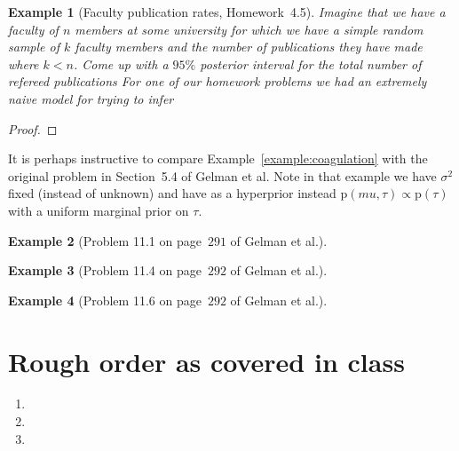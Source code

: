 \documentclass{article}
\newtheorem{example}{Example}
\newcommand{\pdens}[1]{\text{p}\left( #1 \right)}
\begin{document}
\begin{example}[Faculty publication rates, Homework~4.5]
	Imagine that we have a faculty of $n$ members at some university for which we have a simple random sample of $k$ faculty members and the number of publications they have made where $k < n$.
	Come up with a $95\%$ posterior interval for the total number of refereed publications 
	For one of our homework problems we had an extremely naive model for trying to infer 
\end{example}
\begin{proof}
\end{proof}

It is perhaps instructive to compare Example~\ref{example:coagulation} with the original problem in Section~5.4 of Gelman et al.
Note in that example we have $\sigma ^2$ fixed (instead of unknown) and have as a hyperprior instead $\pdens{mu, \tau} \propto \pdens{\tau}$ with a uniform marginal prior on $\tau$.

\begin{example}[Problem 11.1 on page~$291$ of Gelman et al.]
\end{example}

\begin{example}[Problem 11.4 on page~$292$ of Gelman et al.]
\end{example}

\begin{example}[Problem 11.6 on page~$292$ of Gelman et al.]
\end{example}

\appendix

\section{Rough order as covered in class}

\begin{enumerate}
	\item
	\item
	\item
\end{enumerate}
\end{document}
